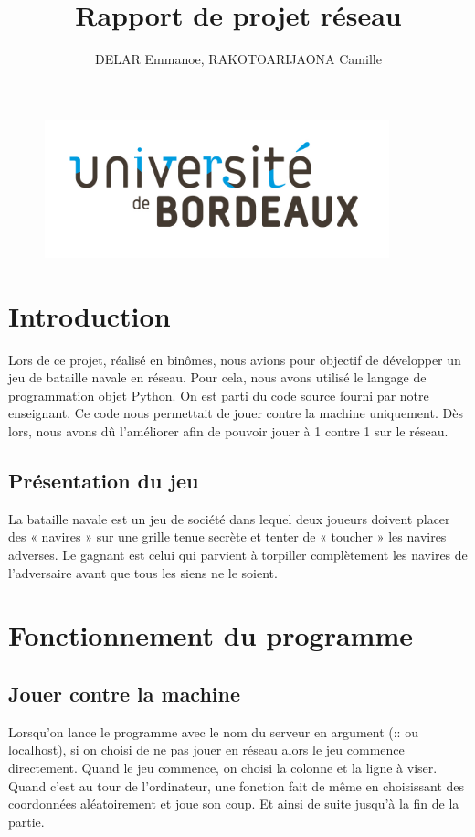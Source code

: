 \documentclass{article}
\title{Rapport de projet r\'eseau}
\author{DELAR Emmanoe, RAKOTOARIJAONA Camille}
\begin{document}
\maketitle
\begin{figure}[!b]
		\centering
		\includegraphics[height=4cm]{logo.jpg}
	\end{figure}
\newpage
\tableofcontents

\newpage
\section{Introduction}
Lors de ce projet, r\'ealis\'e en bin\^omes, nous avions pour objectif de d\'evelopper un jeu de bataille navale en r\'eseau. Pour cela, nous avons utilis\'e le langage de programmation objet Python.
On est parti du code source fourni par notre enseignant. Ce code nous permettait de jouer contre la machine uniquement. D\`es lors, nous avons d\^u l'am\'eliorer afin de pouvoir jouer \`a 1 contre 1 sur le r\'eseau.

\subsection{Pr\'esentation du jeu}
	 La bataille navale est un jeu de soci\'et\'e dans lequel deux joueurs doivent placer des « navires » sur une grille tenue secrète et tenter de « toucher » les navires adverses. Le gagnant est celui qui parvient \`a torpiller compl\`etement les navires de l'adversaire avant que tous les siens ne le soient.


\section{Fonctionnement du programme}
	 \subsection{Jouer contre la machine}
	 Lorsqu'on lance le programme avec le nom du serveur en argument (:: ou localhost), si on choisi de ne pas jouer en r\'eseau alors le jeu commence directement. Quand le jeu commence, on choisi la colonne et la ligne \`a viser. Quand c'est au tour de l'ordinateur, une fonction fait de m\^eme en choisissant des coordonn\'ees al\'eatoirement et joue son coup. Et ainsi de suite jusqu'\`a la fin de la partie. 
\end{document}
